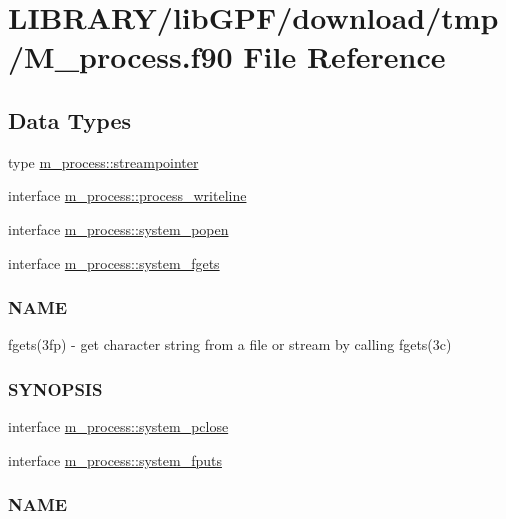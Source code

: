 \hypertarget{M__process_8f90}{}\section{L\+I\+B\+R\+A\+R\+Y/lib\+G\+P\+F/download/tmp/\+M\+\_\+process.f90 File Reference}
\label{M__process_8f90}
\subsection*{Data Types}
\begin{DoxyCompactItemize}
\item 
type \hyperlink{structm__process_1_1streampointer}{m\+\_\+process\+::streampointer}
\item 
interface \hyperlink{interfacem__process_1_1process__writeline}{m\+\_\+process\+::process\+\_\+writeline}
\item 
interface \hyperlink{interfacem__process_1_1system__popen}{m\+\_\+process\+::system\+\_\+popen}
\item 
interface \hyperlink{interfacem__process_1_1system__fgets}{m\+\_\+process\+::system\+\_\+fgets}
\begin{DoxyCompactList}\small\item\em \subsubsection*{N\+A\+ME}

fgets(3fp) -\/ get character string from a file or stream by calling fgets(3c) \subsubsection*{S\+Y\+N\+O\+P\+S\+IS}\end{DoxyCompactList}\item 
interface \hyperlink{interfacem__process_1_1system__pclose}{m\+\_\+process\+::system\+\_\+pclose}
\item 
interface \hyperlink{interfacem__process_1_1system__fputs}{m\+\_\+process\+::system\+\_\+fputs}
\begin{DoxyCompactList}\small\item\em \subsubsection*{N\+A\+ME}


\end{DoxyCompactList}
\end{DoxyCompactItemize}
